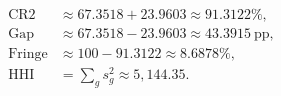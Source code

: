 \begin{align*}
\mathrm{CR2} &\approx 67.3518+23.9603 \approx 91.3122\%, \\
\mathrm{Gap} &\approx 67.3518-23.9603 \approx 43.3915\ \mathrm{pp}, \\
\mathrm{Fringe} &\approx 100-91.3122 \approx 8.6878\%, \\
\mathrm{HHI} &= \sum_g s_g^2 \approx 5,144.35.
\end{align*}
